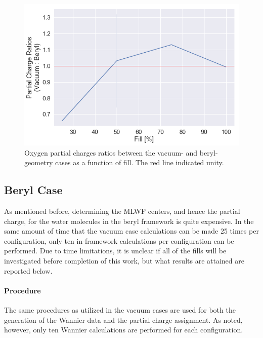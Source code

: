         \begin{figure}
            \centering
            \includegraphics[width=0.9\linewidth]{Figures/System/pc_vacuum_pc_ratios.png}
            \caption{Oxygen partial charges ratios between the vacuum- and beryl-geometry cases as a function of fill. The red line indicated unity.}
            \label{fig:pc_vacuum_pc_ratios}
        \end{figure}
        
        
        \subsection{Beryl Case}
        \label{sec:pc_beryl_case}
        
        As mentioned before, determining the MLWF centers, and hence the partial charge, for the water molecules in the beryl framework is quite expensive. In the same amount of time that the vacuum case calculations can be made 25 times per configuration, only ten in-framework calculations per configuration can be performed. Due to time limitations, it is unclear if all of the fills will be investigated before completion of this work, but what results are attained are reported below.
        
        \paragraph{Procedure} The same procedures as utilized in the vacuum cases are used for both the generation of the Wannier data and the partial charge assignment. As noted, however, only ten Wannier calculations are performed for each configuration.
        
